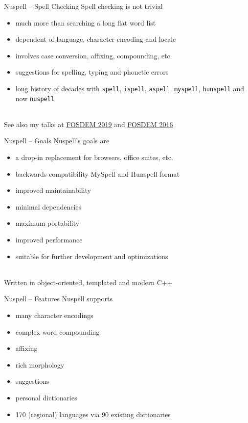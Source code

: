 \documentclass{beamer}
\begin{document}
\begin{frame}{Nuspell – Spell Checking}
Spell checking is \alert{not trivial}
\begin{itemize}
\item much more than searching a long flat word list
\item dependent of language, character encoding and locale
\item involves case conversion, affixing, compounding, etc.
\item suggestions for spelling, typing and phonetic errors
\item long history of decades with \texttt{spell}, \texttt{ispell}, \texttt{aspell}, \texttt{myspell}, \texttt{hunspell} and now \texttt{nuspell}
\end{itemize}
\mbox{}\\
See also my talks at \href{https://archive.fosdem.org/2019/schedule/event/nuspell}{FOSDEM 2019} and \href{https://archive.fosdem.org/2016/schedule/event/integrating\_spell\_and\_grammar\_checking}{FOSDEM 2016}
\end{frame}

\begin{frame}{Nuspell – Goals}
Nuspell's goals are
\begin{itemize}
\item a drop-in replacement for browsers, office suites, etc.
\item backwards compatibility MySpell and Hunspell format
\item improved maintainability
\item minimal dependencies
\item maximum portability
\item improved performance
\item suitable for further development and optimizations
\end{itemize}
\mbox{}\\
Written in object-oriented, templated and modern C++
\end{frame}

\begin{frame}{Nuspell – Features}
Nuspell supports
\begin{itemize}
\item many character encodings
\item complex word compounding
\item affixing
\item rich morphology
\item suggestions
\item personal dictionaries
\item 170 (regional) languages via 90 existing dictionaries
\end{itemize}
\end{frame}
\end{document}
